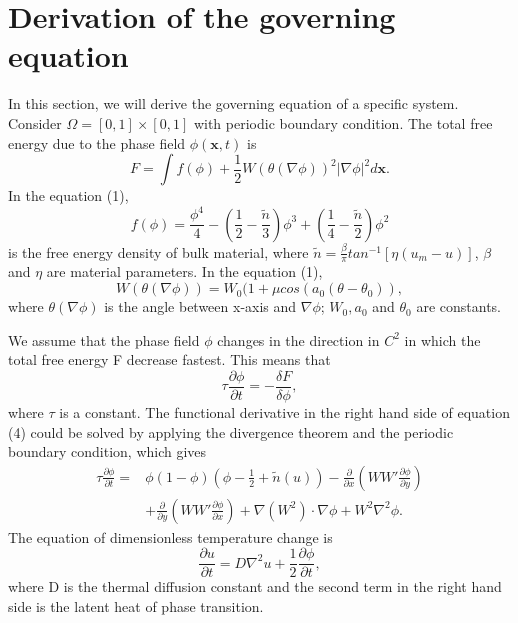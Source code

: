 \documentclass{article}
\begin{document}
    \section{Derivation of the governing equation}
        In this section, we will derive the governing equation of a specific system. Consider $\Omega=[0,1]\times[0,1]$ with periodic boundary condition. The total free energy due to the phase field $\phi(\bm{x},t)$ is
        \begin{equation}
            F=\int f(\phi)+\frac{1}{2}W(\theta(\nabla\phi))^2|\nabla\phi|^2d\bm{x}.
        \end{equation}
        In the equation (1),
        \begin{equation}
            f(\phi)=\frac{\phi^4}{4}-(\frac{1}{2}-\frac{\tilde{n}}{3})\phi^3+(\frac{1}{4}-\frac{\tilde{n}}{2})\phi^2
        \end{equation}
        is the free energy density of bulk material, where $\tilde{n}=\frac{\beta}{\pi}tan^{-1}[\eta(u_m-u)]$, $\beta$ and $\eta$ are material parameters. In the equation (1),
        \begin{equation}
            W(\theta(\nabla\phi))=W_0(1+\mu cos(a_0(\theta-\theta_0)),
        \end{equation}
        where $\theta(\nabla\phi)$ is the angle between x-axis and $\nabla\phi$; $W_0, a_0$ and $ \theta_0$ are constants.
        \par We assume that the phase field $\phi$ changes in the direction in $C^2$ in which the total free energy F decrease fastest. This means that
        \begin{equation}
            \tau\frac{\partial\phi}{\partial t}=-\frac{\delta F}{\delta\phi},
        \end{equation}
        where $\tau$ is a constant. The functional derivative in the right hand side of equation (4) could be solved by applying the divergence theorem and the periodic boundary condition, which gives
        \begin{equation}
            \begin{aligned}
            \tau\frac{\partial \phi}{\partial t}=& \phi(1-\phi)(\phi-\frac{1}{2}+\tilde{n}(u)) - \frac{\partial}{\partial x}(WW'\frac{\partial\phi}{\partial y})\\ 
                                                 & + \frac{\partial}{\partial y}(WW'\frac{\partial\phi}{\partial x}) + \nabla(W^2)\cdot\nabla\phi + W^2\nabla^2\phi. 
            \end{aligned}
        \end{equation}
        The equation of dimensionless temperature change is
        \begin{equation}
            \frac{\partial u}{\partial t}=D\nabla^2u+\frac{1}{2}\frac{\partial\phi}{\partial t},
        \end{equation}
        where D is the thermal diffusion constant and the second term in the right hand side is the latent heat of phase transition.
\end{document}
